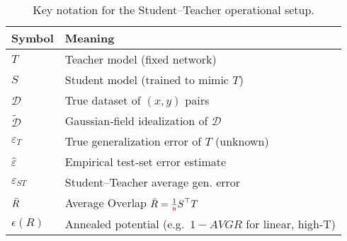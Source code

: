 \begin{table}[h]
\centering
\begin{tabular}{@{}ll@{}}
\toprule
\textbf{Symbol} & \textbf{Meaning} \\
\midrule
$T$                      & Teacher model (fixed network) \\
$S$                      & Student model (trained to mimic $T$) \\
$\mathcal D$             & True dataset of $(x,y)$ pairs \\
$\widetilde{\mathcal D}$ & Gaussian‐field idealization of $\mathcal D$ \\
$\varepsilon_T$          & True generalization error of $T$ (unknown) \\
$\widehat\varepsilon$    & Empirical test‐set error estimate \\
$\varepsilon_{ST}$       & Student–Teacher average gen. error \\
$\bar{R}$                      & Average Overlap $\displaystyle \bar{R}=\tfrac{1}{{\color{red}\sf{n}}}S^\top T$ \\
$\epsilon(R)$            & Annealed potential (e.g.\ $1-AVGR$ for linear, high-T) \\
\bottomrule
\end{tabular}
\caption{Key notation for the Student–Teacher operational setup.}
\label{tab:st_notation}
\end{table}
